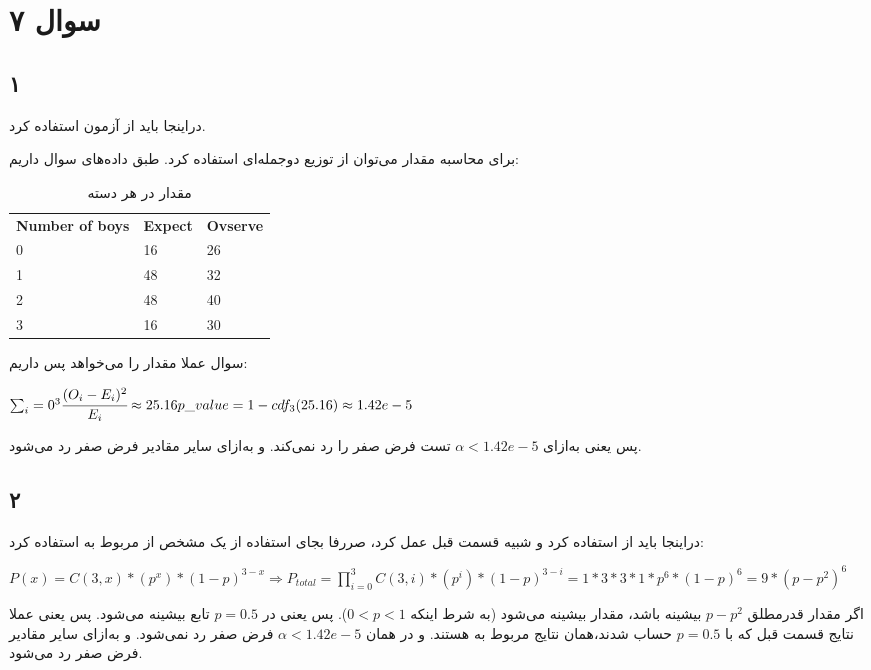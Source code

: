 \documentclass[12pt]{article}
\begin{document}
\section{سوال ۷}
\subsection{۱}
	دراینجا باید از آزمون 
	استفاده کرد. 
	
	برای محاسبه مقدار  می‌توان از   توزیع دوجمله‌ای استفاده کرد. 
	طبق داده‌های سوال داریم:
	\begin{table}[H]
		\centering
		\caption{مقدار  در هر دسته}
		\begin{latin}
			\label{tab:q7_table}
			\begin{tabular}{| l l l  |}
				\toprule
				\textbf{Number of boys} &  \textbf{Expect} & \textbf{Ovserve} \\
				0 & 16 & 26 \\
				1 &48 & 32 \\
				2 & 48 & 40 \\
				3 & 16 & 30 \\
				\bottomrule
			\end{tabular}
		\end{latin}
	\end{table}
	سوال عملا مقدار 
	را می‌خواهد پس داریم:
	\begin{latin}
		$
		\sum_i=0^3 \cfrac{(O_i - E_i)^2}{E_i} \approx 25.16
		\\
		p\_value = 1 - cdf_3(25.16) \approx 1.42e-5
		$
	\end{latin}
	پس یعنی به‌ازای 
	$\alpha < 1.42e-5$
	تست فرض صفر را رد نمی‌کند. و به‌ازای سایر مقادیر فرض صفر رد می‌شود.
	\subsection{۲}
	دراینجا باید از 
	استفاده کرد و شبیه قسمت قبل عمل کرد، صررفا بجای استفاده از یک 
	مشخص 
	از 
	مربوط به 
	استفاده کرد:
	\begin{latin}
		$
		P(x) = C(3, x) * (p^x) * (1 - p)^{3 - x}
		\Rightarrow 
		P_{total} = \prod\limits_{i = 0}^3 C(3, i) *  (p^i) * (1 - p)^{3 - i}
		= 
		 1 * 3 * 3 * 1 * p^6 * (1 - p)^6
		 = 
		 9 * (p - p^2)^6
		$
	\end{latin}
	اگر مقدار قدرمطلق 
	$p - p^2$
	بیشینه باشد، مقدار 
	بیشینه می‌شود (به شرط اینکه $0<p<1$). پس یعنی در 	$p=0.5$ تابع بیشینه می‌شود. پس یعنی عملا نتایج قسمت قبل که با 
	$p=0.5$ 
	حساب شدند،‌همان نتایج مربوط به 
	هستند. و در همان 
		$\alpha < 1.42e-5$
		فرض صفر رد نمی‌شود.  و به‌ازای سایر مقادیر فرض صفر رد می‌شود.
\end{document}
